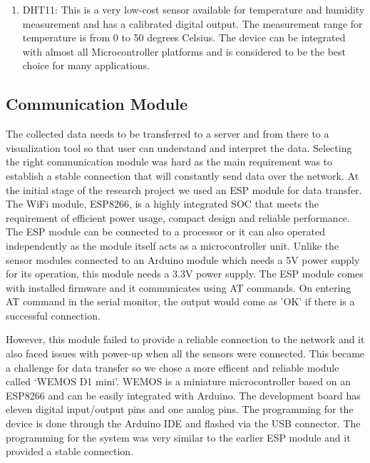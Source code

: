 \begin{enumerate}
\item DHT11: This is a very low-cost sensor available for temperature and humidity measurement and has a calibrated digital output. The measurement range for temperature is from 0 to 50 degrees Celsius. The device can be integrated with almost all Microcontroller platforms and is considered to be the best choice for many applications.

 \end{enumerate}

 \subsection{Communication Module}
 
 The collected data needs to be transferred to a server and from there to a visualization tool so that user can understand and interpret the data. Selecting the right communication module was hard as the main requirement was to establish a stable connection that will constantly send data over the network. At the initial stage of the research project we used an ESP module for data transfer. The WiFi module, ESP8266, is a highly integrated SOC that meets the requirement of efficient power usage, compact design and reliable performance\cite{Systems2018}. The ESP module can be connected to a processor or it can also operated independently as the module itself acts as a microcontroller unit. Unlike the sensor modules connected to an Arduino module which needs a 5V power supply for its operation, this module needs a 3.3V power supply. The ESP module comes with installed firmware and it communicates using AT commands. On entering AT command in the serial monitor, the output would come as 'OK' if there is a successful connection. 

 However, this module failed to provide a reliable connection to the network and it also faced issues with power-up when all the sensors were connected. This became a challenge for data transfer so we chose a more efficent and reliable module called \lq{WEMOS D1 mini}\rq. WEMOS is a miniature microcontroller based on an ESP8266 and can be easily integrated with Arduino. The development board has eleven digital input/output pins and one analog pins. The programming for the device is done through the Arduino IDE and flashed via the USB connector. The programming for the system was very similar to the earlier ESP module and it provided a stable connection.
 
